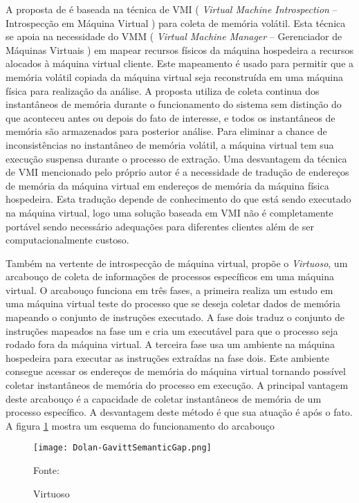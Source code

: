 A proposta de \cite{PoiselVMI:2013} é baseada na técnica de VMI ( \textit{Virtual Machine Introspection} -- Introspecção em Máquina Virtual ) para coleta de memória volátil. 
%
Esta técnica se apoia na necessidade do VMM ( \textit{Virtual Machine Manager} -- Gerenciador de Máquinas Virtuais ) em mapear recursos físicos da máquina hospedeira a recursos alocados à máquina virtual cliente.
%
Este mapeamento é usado para permitir que a memória volátil copiada da máquina virtual seja reconstruída em uma máquina física para realização da análise.
%
A proposta utiliza de coleta continua dos instantâneos de memória durante o funcionamento do sistema sem distinção do que aconteceu antes ou depois do fato de interesse, e todos os instantâneos de memória são armazenados para posterior análise.
%
Para eliminar a chance de inconsistências no instantâneo de memória volátil, a máquina virtual tem sua execução suspensa durante o processo de extração.
%
Uma desvantagem da técnica de VMI mencionado pelo próprio autor é a necessidade de tradução de endereços de memória da máquina virtual em endereços de memória da máquina física hospedeira.
%
Esta tradução depende de conhecimento do que está sendo executado na máquina virtual, logo uma solução baseada em VMI não é completamente portável sendo necessário adequações para diferentes clientes além de ser computacionalmente custoso.
%

Também na vertente de introspecção de máquina virtual, \cite{Dolan-GavittSemanticGap:2011} propõe o \textit{Virtuoso}, um arcabouço de coleta de informações de processos específicos em uma máquina virtual.
%
O arcabouço funciona em três fases, a primeira realiza um estudo em uma máquina virtual teste do processo que se deseja coletar dados de memória mapeando o conjunto de instruções executado. 
%
A fase dois traduz o conjunto de instruções mapeados na fase um e cria um executável para que o processo seja rodado fora da máquina virtual.
%
A terceira fase usa um ambiente na máquina hospedeira para executar as instruções extraídas na fase dois. Este ambiente consegue acessar os endereços de memória do máquina virtual tornando possível coletar instantâneos de memória do processo em execução.
%
A principal vantagem deste arcabouço é a capacidade de coletar instantâneos de memória de um processo específico.
%
A desvantagem deste método é que sua atuação é após o fato.
%
A figura \ref{fig:Dolan-GavittSemanticGap} mostra um esquema do funcionamento do arcabouço

\begin{figure}[htb!]
\footnotesize
\caption{Virtuoso}
\texttt{[image: Dolan-GavittSemanticGap.png]}
\centering
\label{fig:Dolan-GavittSemanticGap}
\begin{center}
Fonte: \cite{Dolan-GavittSemanticGap:2011} 
\end{center}
\end{figure}


